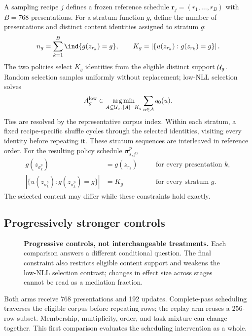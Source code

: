A sampling recipe $j$ defines a frozen reference schedule $\mathbf r_j=(r_1,\ldots,r_B)$ with $B=768$ presentations. For a stratum function $g$, define the number of presentations and distinct content identities assigned to stratum $g$:
\begin{equation}
 n_g=\sum_{k=1}^{B}\ind\{g(z_{r_k})=g\},\qquad
 K_g=\left|\{u(z_{r_k}):g(z_{r_k})=g\}\right|.
 \label{eq:quotas}
\end{equation}
The two policies select $K_g$ identities from the eligible distinct support $\mathcal{U}_g$. Random selection samples uniformly without replacement; low-NLL selection solves
\begin{equation}
 A_g^{\mathrm{low}}\in\underset{A\subseteq\mathcal{U}_g,\,|A|=K_g}{\arg\min}
 \sum_{u\in A}q_0(u).
 \label{eq:selection}
\end{equation}
Ties are resolved by the representative corpus index. Within each stratum, a fixed recipe-specific shuffle cycles through the selected identities, visiting every identity before repeating it. These stratum sequences are interleaved in reference order. For the resulting policy schedule $\boldsymbol\sigma^{p}_{s,j}$,
\begin{align}
 g(z_{\sigma_k^p})&=g(z_{r_k})\quad &&\text{for every presentation }k,\label{eq:positions}\\
 \left|\{u(z_{\sigma_k^p}):g(z_{\sigma_k^p})=g\}\right|&=K_g\quad &&\text{for every stratum }g.\label{eq:support}
\end{align}
The selected content may differ while these constraints hold exactly.

\subsection{Progressively stronger controls}
\begin{figure}[t]
\centering
\resizebox{\linewidth}{!}{}
\caption{\textbf{Progressive controls, not interchangeable treatments.} Each comparison answers a different conditional question. The final constraint also restricts eligible content support and weakens the low-NLL selection contrast; changes in effect size across stages cannot be read as a mediation fraction.}
\label{fig:controls}
\end{figure}
Both arms receive 768 presentations and 192 updates. Complete-pass scheduling traverses the eligible corpus before repeating rows; the replay arm reuses a 256-row subset. Membership, multiplicity, order, and task mixture can change together. This first comparison evaluates the scheduling intervention as a whole.

